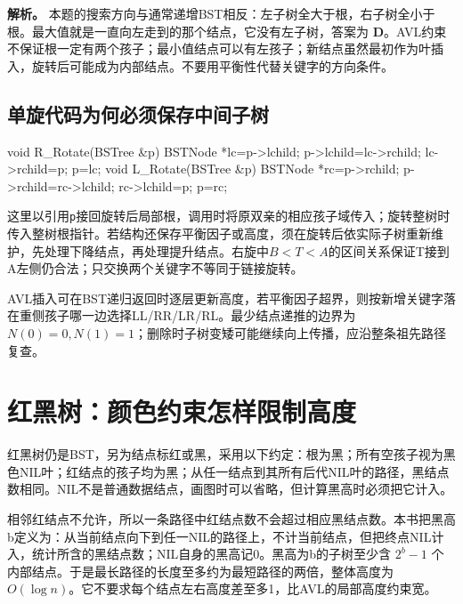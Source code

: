 \textbf{解析。} 本题的搜索方向与通常递增BST相反：左子树全大于根，右子树全小于根。最大值就是一直向左走到的那个结点，它没有左子树，答案为 \textbf{D}。AVL约束不保证根一定有两个孩子；最小值结点可以有左孩子；新结点虽然最初作为叶插入，旋转后可能成为内部结点。不要用平衡性代替关键字的方向条件。

\subsection{单旋代码为何必须保存中间子树}\label{DS07-rotate-code}

\par\medskip\noindent\begin{minipage}{\linewidth}
\begin{codeblock}[language=C++]
void R_Rotate(BSTree &p) {
    BSTNode *lc=p->lchild;
    p->lchild=lc->rchild;
    lc->rchild=p;
    p=lc;
}
void L_Rotate(BSTree &p) {
    BSTNode *rc=p->rchild;
    p->rchild=rc->lchild;
    rc->lchild=p;
    p=rc;
}
\end{codeblock}
\end{minipage}\par\medskip

这里以引用\texttt{p}接回旋转后局部根，调用时将原双亲的相应孩子域传入；旋转整树时传入整树根指针。若结构还保存平衡因子或高度，须在旋转后依实际子树重新维护，先处理下降结点，再处理提升结点。右旋中\(B<T<A\)的区间关系保证T接到A左侧仍合法；只交换两个关键字不等同于链接旋转。

AVL插入可在BST递归返回时逐层更新高度，若平衡因子超界，则按新增关键字落在重侧孩子哪一边选择LL/RR/LR/RL。最少结点递推的边界为\(N(0)=0,N(1)=1\)；删除时子树变矮可能继续向上传播，应沿整条祖先路径复查。

\section{红黑树：颜色约束怎样限制高度}\label{DS07-06}

红黑树仍是BST，另为结点标红或黑，采用以下约定：根为黑；所有空孩子视为黑色NIL叶；红结点的孩子均为黑；从任一结点到其所有后代NIL叶的路径，黑结点数相同。NIL不是普通数据结点，画图时可以省略，但计算黑高时必须把它计入。

相邻红结点不允许，所以一条路径中红结点数不会超过相应黑结点数。本书把黑高b定义为：从当前结点向下到任一NIL的路径上，不计当前结点，但把终点NIL计入，统计所含的黑结点数；NIL自身的黑高记0。黑高为b的子树至少含 \(2^b-1\) 个内部结点。于是最长路径的长度至多约为最短路径的两倍，整体高度为 \(O(\log n)\)。它不要求每个结点左右高度差至多1，比AVL的局部高度约束宽。

